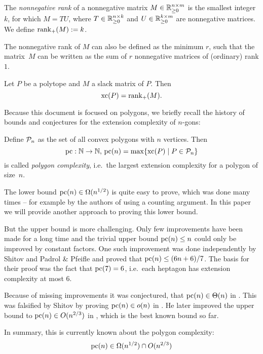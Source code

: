 \begin{definition}
  The \emph{nonnegative rank} of a nonnegative matrix $M \in \R_{\geq 0}^{n \times m}$ is the smallest integer $k$, for which $M = TU$, where $T \in \R_{\geq 0}^{n \times k}$ and $U \in \R_{\geq 0}^{k \times m}$ are nonnegative matrices.
  We define $\rank_+(M) := k$.
\end{definition}

The nonnegative rank of $M$ can also be defined as the minimum $r$, such that the matrix~$M$ can be written as the sum of $r$ nonnegative matrices of (ordinary) rank $1$.

\begin{theorem}
  Let $P$ be a polytope and $M$ a slack matrix of $P$. Then $$\xc(P) = \rank_+(M) .$$
\end{theorem}

Because this document is focused on polygons, we briefly recall the history of bounds and conjectures for the extension complexity of $n$-gons:

Define $\P_n$ as the set of all convex polygons with $n$ vertices. Then $$\pc:\N \to \N,\,\pc(n) = \max \{\xc(P) \mid P \in \P_n\}$$ is called \emph{polygon complexity}, i.e.\ the largest extension complexity for a polygon of size~$n$.

The lower bound $\pc(n) \in \Omega(n^{1/2})$ is quite easy to prove, which was done many times -- for example by the authors of \cite{fiorini2012extended} using a counting argument. In this paper we will provide another approach to proving this lower bound. 

But the upper bound is more challenging. Only few improvements have been made for a long time and the trivial upper bound $\pc(n) \leq n$ could only be improved by constant factors. One such improvement was done independently by Shitov \cite{shitov2014upper} and Padrol \& Pfeifle \cite{padrol2014polygons} and proved that $\pc(n) \leq (6n+6)/7$. The basis for their proof was the fact that $\pc(7)=6$, i.e.\ each heptagon has extension complexity at most 6.

Because of missing improvements it was conjectured, that $\pc(n) \in \Theta(n)$ in \cite{fiorini2012extended}. This was falsified by Shitov by proving $\pc(n) \in o(n)$ in \cite{shitov2014sublinear}. He later improved the upper bound to $\pc(n) \in O(n^{2/3})$ in \cite{shitov2020sublinear}, which is the best known bound so far.

In summary, this is currently known about the polygon complexity:
$$\pc(n) \in \Omega(n^{1/2}) \cap O(n^{2/3})$$

